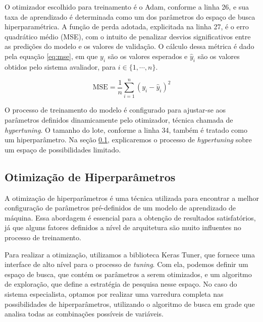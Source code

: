 O otimizador escolhido para treinamento é o Adam, conforme a linha 26, e sua taxa de aprendizado é determinada como um dos parâmetros do espaço de busca hiperparamétrica. A função de perda adotada, explicitada na linha 27, é o erro quadrático médio (MSE), com o intuito de penalizar desvios significativos entre as predições do modelo e os valores de validação. O cálculo dessa métrica é dado pela equação \ref{eq:mse}, em que $y_{i}$ são os valores esperados e $\hat{y}_{i}$ são os valores obtidos pelo sistema avaliador, para $i \in \{1, \cdots, n\}$.

\begin{equation}
    \label{eq:mse}
    \text{MSE} = \frac{1}{n} \sum_{i=1}^{n} (y_i - \hat{y}_i)^2
\end{equation}

O processo de treinamento do modelo é configurado para ajustar-se aos parâmetros definidos dinamicamente pelo otimizador, técnica chamada de \textit{hypertuning}. O tamanho do lote, conforme a linha 34, também é tratado como um hiperparâmetro. Na seção \ref{subsec:hyperparameter-tuning}, explicaremos o processo de \textit{hypertuning} sobre um espaço de possibilidades limitado.

\subsection{Otimização de Hiperparâmetros}
\label{subsec:hyperparameter-tuning}



A otimização de hiperparâmetros é uma técnica utilizada para encontrar a melhor configuração de parâmetros pré-definidos de um modelo de aprendizado de máquina. Essa abordagem é essencial para a obtenção de resultados satisfatórios, já que alguns fatores definidos a nível de arquitetura são muito influentes no processo de treinamento.

Para realizar a otimização, utilizamos a biblioteca Keras Tuner, que fornece uma interface de alto nível para o processo de \textit{tuning}. Com ela, podemos definir um espaço de busca, que contém os parâmetros a serem otimizados, e um algoritmo de exploração, que define a estratégia de pesquisa nesse espaço. No caso do sistema especialista, optamos por realizar uma varredura completa nas possibilidades de hiperparâmetros, utilizando o algoritmo de busca em grade que analisa todas as combinações possíveis de variáveis.

